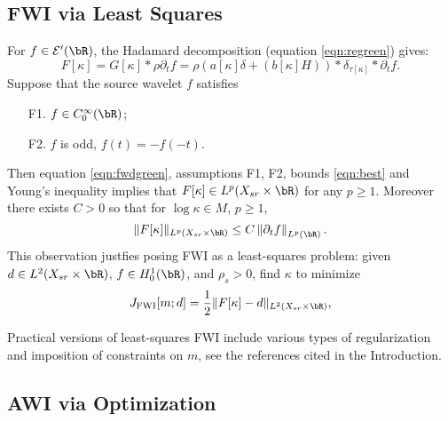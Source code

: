 \subsection{FWI via Least Squares}
For $f \in {\cal E}'(\bR)$, the Hadamard decomposition 
(equation \ref{eqn:regreen}) gives:
\begin{equation}
  \label{eqn:fwdgreen}
  F[\kappa] = G[\kappa] * \rho \partial_t f  = \rho( a[\kappa]\delta
  +  (b[\kappa]H)) *\delta_{\tau[\kappa]}*\partial_t f.
\end{equation}
Suppose that the source wavelet $f$ satisfies
\begin{itemize}
\item[F1. ] $f \in C^{\infty}_0(\bR)$;
\item[F2. ] $f$ is odd, $f(t) = -f(-t)$.
\end{itemize}
Then equation \ref{eqn:fwdgreen}, assumptions F1, F2, bounds
\ref{eqn:best} and Young's inequality implies that $F[\kappa] \in
L^p(X_{sr} \times \bR)$ for any $p \ge 1$. Moreover there exists
$C>0$ so that for $\log \kappa\in M$, $p \ge 1$,
\begin{equation}
  \label{eqn:fwdnorm}
  \|F[\kappa]\|_{L^p(X_{sr} \times \bR)} \le C \left\|\partial_t f\right\|_{L^p(\bR)}.
\end{equation}
This observation justfies posing FWI as a least-squares problem: given $d \in
L^2(X_{sr}\times \bR)$, $f \in H^1_0(\bR)$, and $\rho_s>0$, find $\kappa$ to minimize
\begin{equation}
  \label{eqn:fwi}
  J_{\rm FWI}[m;d]= \frac{1}{2}\|F[\kappa]-d\|_{L^2(X_{sr} \times \bR)},
\end{equation}

Practical versions of least-squares FWI include various types of regularization and
imposition of constraints on $m$, see the references cited in the
Introduction.

\subsection{AWI via Optimization}

